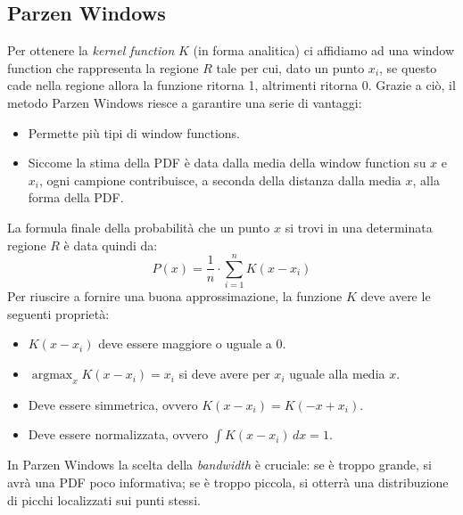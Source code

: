 \documentclass[a4paper,oneside,titlepage]{book}
\DeclareMathOperator*{\argmax}{\arg\max}
\begin{document}
\subsection{Parzen Windows}
Per ottenere la \textit{kernel function} $K$ (in forma analitica) ci affidiamo ad una window function che rappresenta la regione $R$ tale per cui, dato un punto $x_i$, se questo cade nella regione allora la funzione ritorna 1, altrimenti ritorna 0. Grazie a ciò, il metodo Parzen Windows riesce a garantire una serie di vantaggi:
\begin{itemize}
    \item Permette più tipi di window functions.
    \item Siccome la stima della PDF è data dalla media della window function su $x$ e $x_i$, ogni campione contribuisce, a seconda della distanza dalla media $x$, alla forma della PDF.
\end{itemize}
La formula finale della probabilità che un punto $x$ si trovi in una determinata regione $R$ è data quindi da:
\[ P(x) = \frac{1}{n} \cdot \sum_{i=1}^n K(x-x_i) \]
\newpage
\noindent
Per riuscire a fornire una buona approssimazione, la funzione $K$ deve avere le seguenti proprietà:
\begin{itemize}
    \item $K(x-x_i)$ deve essere maggiore o uguale a 0.
    \item $\argmax_x K(x-x_i) = x_i$ si deve avere per $x_i$ uguale alla media $x$.
    \item Deve essere simmetrica, ovvero $K(x-x_i) = K(-x+x_i)$.
    \item Deve essere normalizzata, ovvero $\int K(x-x_i) \, dx = 1$.
\end{itemize}
In Parzen Windows la scelta della \textit{bandwidth} è cruciale: se è troppo grande, si avrà una PDF poco informativa; se è troppo piccola, si otterrà una distribuzione di picchi localizzati sui punti stessi.
\end{document}
